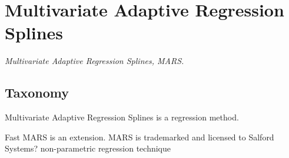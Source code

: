 
\section{Multivariate Adaptive Regression Splines} 
\label{sec:mars}

\emph{Multivariate Adaptive Regression Splines, MARS.}

\subsection{Taxonomy}
Multivariate Adaptive Regression Splines is a regression method.

Fast MARS is an extension.
MARS is trademarked and licensed to Salford Systems?
non-parametric regression technique


